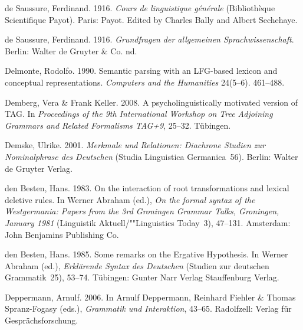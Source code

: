 \begin{thebibliography}{1420}
{de Saussure}, Ferdinand. 1916{}.
\newblock \emph{Cours de linguistique g{\'e}n{\'e}rale}  (Biblioth{\`e}que
  Scientifique Payot).
\newblock Paris: Payot.
\newblock Edited by Charles Bally and Albert Sechehaye.

{de Saussure}, Ferdinand. 1916{}.
\newblock \emph{{Grundfragen der allgemeinen Sprachwissenschaft}}.
\newblock Berlin: Walter de Gruyter \& Co.
\newblock \2nd.

Delmonte, Rodolfo. 1990.
\newblock Semantic parsing with an {LFG}-based lexicon and conceptual
  representations.
\newblock \emph{Computers and the Humanities} 24(5--6). 461--488.

Demberg, Vera \& Frank Keller. 2008.
\newblock A psycholinguistically motivated version of {TAG}.
\newblock In \emph{Proceedings of the {9th International Workshop on Tree
  Adjoining Grammars and Related Formalisms TAG+9}}, 25--32. T{\"u}bingen.

Demske, Ulrike. 2001.
\newblock \emph{{Merkmale und Relationen: Diachrone Studien zur Nominalphrase
  des Deutschen}} (Studia Linguistica Germanica~56).
\newblock Berlin: Walter de Gruyter Verlag.

{den Besten}, Hans. 1983.
\newblock On the interaction of root transformations and lexical deletive
  rules.
\newblock In Werner Abraham (ed.), \emph{On the formal syntax of the
  {Westgermania: Papers from the 3rd Groningen Grammar Talks, Groningen,
  January 1981}} (Linguistik Aktuell/""Linguistics Today~3), 47--131.
  Amsterdam: John Benjamins Publishing Co.

{den Besten}, Hans. 1985.
\newblock Some remarks on the {Ergative Hypothesis}.
\newblock In Werner Abraham (ed.), \emph{{Erkl{\"a}rende Syntax des Deutschen}}
  (Studien zur deutschen Grammatik~25), 53--74. T{\"u}bingen: \original Gunter
  Narr Verlag \jetzt Stauffenburg Verlag.

Deppermann, Arnulf. 2006.
\newblock In Arnulf Deppermann, Reinhard Fiehler \& Thomas Spranz-Fogasy
  (eds.), \emph{{Grammatik und Interaktion}}, 43--65. Radolfzell: Verlag
  f{\"u}r Gespr{\"a}chsforschung.


\end{thebibliography}
